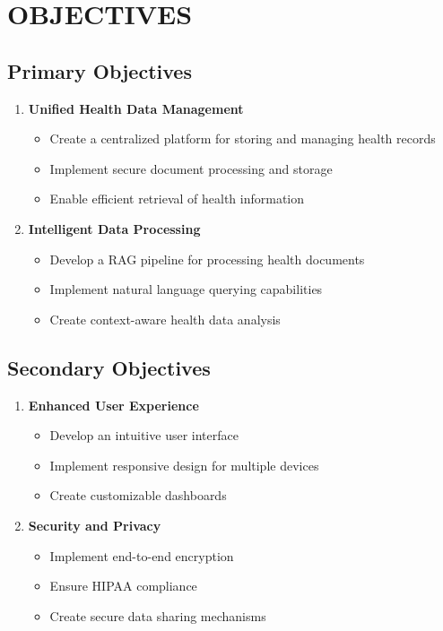 \section{OBJECTIVES}

\subsection{Primary Objectives}
\begin{enumerate}
    \item \textbf{Unified Health Data Management}
    \begin{itemize}
        \item Create a centralized platform for storing and managing health records
        \item Implement secure document processing and storage
        \item Enable efficient retrieval of health information
    \end{itemize}

    \item \textbf{Intelligent Data Processing}
    \begin{itemize}
        \item Develop a RAG pipeline for processing health documents
        \item Implement natural language querying capabilities
        \item Create context-aware health data analysis
    \end{itemize}
\end{enumerate}

\subsection{Secondary Objectives}
\begin{enumerate}
    \item \textbf{Enhanced User Experience}
    \begin{itemize}
        \item Develop an intuitive user interface
        \item Implement responsive design for multiple devices
        \item Create customizable dashboards
    \end{itemize}

    \item \textbf{Security and Privacy}
    \begin{itemize}
        \item Implement end-to-end encryption
        \item Ensure HIPAA compliance
        \item Create secure data sharing mechanisms
    \end{itemize}
\end{enumerate} 
